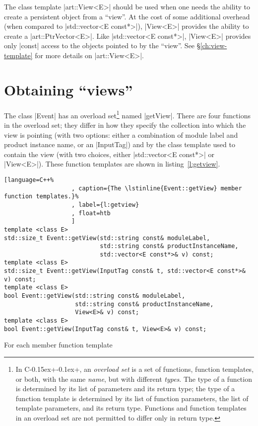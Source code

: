 \documentclass[letterpaper,10pt,article]{memoir}
\newcommand{\cpp}{C\kern-0.15ex{+}\kern-0.1ex{+}\xspace} %
\begin{document}
The class template |art::View<E>| should be used when one needs the
ability to create a persistent object from a ``view''. At the cost of
some additional overhead (when compared to |std::vector<E const*>|),
|View<E>| provides the ability to create a |art::PtrVector<E>|. Like
|std::vector<E const*>|, |View<E>| provides only |const| access to the
objects pointed to by the ``view''. See \S\ref{ch:view-template} for
more details on |art::View<E>|.

\chapter{Obtaining ``views''}

The class |Event| has an overload set\footnote{In \cpp, an
  \emph{overload set} is a set of functions, function templates, or
  both, with the same \emph{name}, but with different
  \emph{types}. The type of a function is determined by its list of
  parameters and its return type; the type of a function template is
  determined by its list of function parameters, the list of template
  parameters, and its return type. Functions and function templates in
  an overload set are not permitted to differ only in return type.}
named |getView|. There are four functions in the overload set; they
differ in how they specify the collection into which the view is
pointing (with two options: either a combination of module label and
product instance name, or an |InputTag|) and by the class template
used to contain the view (with two choices, either %
|std::vector<E const*>| or |View<E>|). These function templates are shown in
listing~\ref{l:getview}.
\begin{lstlisting}[language=C++%
                   , caption={The \lstinline{Event::getView} member function templates.}%
                   , label={l:getview}
                   , float=htb
                   ]
template <class E>
std::size_t Event::getView(std::string const& moduleLabel,
                           std::string const& productInstanceName,
                           std::vector<E const*>& v) const;
template <class E>
std::size_t Event::getView(InputTag const& t, std::vector<E const*>& v) const;
template <class E>
bool Event::getView(std::string const& moduleLabel,
                    std::string const& productInstanceName,
                    View<E>& v) const;
template <class E>
bool Event::getView(InputTag const& t, View<E>& v) const;
\end{lstlisting}

For each member function template
\end{document}
